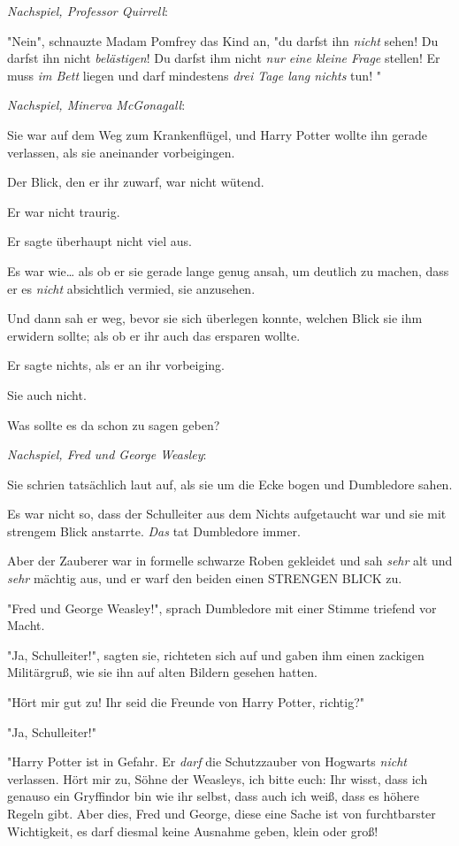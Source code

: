 {\emph{Nachspiel, Professor Quirrell}:

"Nein", schnauzte Madam Pomfrey das Kind an, "du darfst ihn \emph{nicht} sehen! Du darfst ihn nicht \emph{belästigen}! Du darfst ihm nicht \emph{nur eine kleine Frage} stellen! Er muss \emph{im Bett} liegen und darf mindestens \emph{drei Tage lang nichts} tun! "

\emph{Nachspiel, Minerva McGonagall}:

Sie war auf dem Weg zum Krankenflügel, und Harry Potter wollte ihn gerade verlassen, als sie aneinander vorbeigingen.

Der Blick, den er ihr zuwarf, war nicht wütend.

Er war nicht traurig.

Er sagte überhaupt nicht viel aus.

Es war wie… als ob er sie gerade lange genug ansah, um deutlich zu machen, dass er es \emph{nicht} absichtlich vermied, sie anzusehen.

Und dann sah er weg, bevor sie sich überlegen konnte, welchen Blick sie ihm erwidern sollte; als ob er ihr auch das ersparen wollte.

Er sagte nichts, als er an ihr vorbeiging.

Sie auch nicht.

Was sollte es da schon zu sagen geben?

\emph{Nachspiel, Fred und George Weasley}:

Sie schrien tatsächlich laut auf, als sie um die Ecke bogen und Dumbledore sahen.

Es war nicht so, dass der Schulleiter aus dem Nichts aufgetaucht war und sie mit strengem Blick anstarrte. \emph{Das} tat Dumbledore immer.

Aber der Zauberer war in formelle schwarze Roben gekleidet und sah \emph{sehr} alt und \emph{sehr} mächtig aus, und er warf den beiden einen STRENGEN BLICK zu.

"Fred und George Weasley!", sprach Dumbledore mit einer Stimme triefend vor Macht.

"Ja, Schulleiter!", sagten sie, richteten sich auf und gaben ihm einen zackigen Militärgruß, wie sie ihn auf alten Bildern gesehen hatten.

"Hört mir gut zu! Ihr seid die Freunde von Harry Potter, richtig?"

"Ja, Schulleiter!"

"Harry Potter ist in Gefahr. Er \emph{darf} die Schutzzauber von Hogwarts \emph{nicht} verlassen. Hört mir zu, Söhne der Weasleys, ich bitte euch: Ihr wisst, dass ich genauso ein Gryffindor bin wie ihr selbst, dass auch ich weiß, dass es höhere Regeln gibt. Aber dies, Fred und George, diese eine Sache ist von furchtbarster Wichtigkeit, es darf diesmal keine Ausnahme geben, klein oder groß!

}
